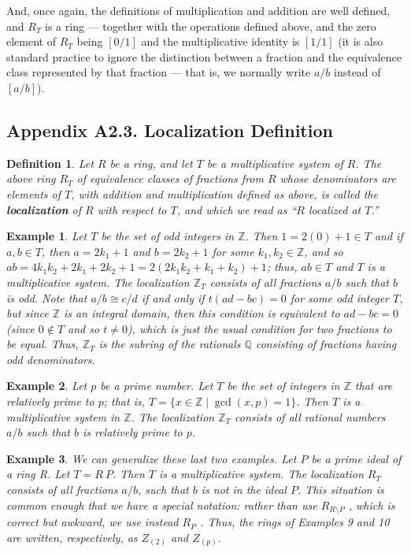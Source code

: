 \documentclass[12pt,reqno]{amsart}
\theoremstyle{plain}
\newtheorem{defi}{Definition}
\newtheorem{ex}{Example}
\newcommand{\zz}{\mathbb Z}
\newcommand{\qq}{\mathbb Q}
\begin{document}
And, once again, the definitions of multiplication and addition are well defined, and $R_T$ is a ring — together with the operations defined above, and the zero element of $R_T$ being $[0/1]$ and the multiplicative identity is $[1/1]$ (it is also standard practice to ignore the distinction between a fraction and the equivalence class represented by that fraction — that is, we normally write $a/b$ instead of $[a/b]$).
 
\subsection{Appendix A2.3. Localization Definition}\begin{defi} Let $R$ be a ring, and let $T$ be a multiplicative system of $R$. The above ring $R_T$ of equivalence classes of fractions from $R$ whose denominators are elements of $T$, with addition and multiplication defined as above, is called the \textbf{localization} of $R$ with respect to $T$, and which we read as ``$R$ localized at $T$.” 
\end{defi} 
\begin{ex} Let $T$ be the set of odd integers in $\zz$. Then $1 = 2(0)+1 \in T$ and if $a, b \in T$, then $a=2k_1 +1 $ and $b=2k_2 + 1$ for some $k_1, k_2 \in \zz$, and so $ab = 4k_1 k_2 +2 k_1 + 2k_2 + 1 = 2(2k_1 k_2 + k_1 + k_2) + 1$; thus, $ab \in T$ and $T$ is a multiplicative system.  The localization $\zz_T$ consists of all fractions $a/b$ such that $b$ is odd. Note that $a/b \cong c/d$ if and only if $t(ad-bc) = 0$ for some odd integer $T$, but since $\zz$ is an integral domain, then this condition is equivalent to $ad-bc = 0$ (since $0 \notin T$ and so $t \neq 0$), which is just the usual condition for two fractions to be equal. Thus, $\zz_T$ is the subring of the rationals $\qq$ consisting of fractions having odd denominators. 
\end{ex} 
\begin{ex} Let $p$ be a prime number. Let $T$ be the set of integers in $\zz$ that are relatively prime to $p$; that is, $T = \{ x \in \zz \mid \gcd (x, p ) = 1\}$. Then $T$ is a multiplicative system in $\zz$. The localization $\zz_T$ consists of all rational numbers $a/b$ such that $b$ is relatively prime to $p$.
\end{ex} 
\begin{ex} 
We can generalize these last two examples. Let $P$ be a prime ideal of a ring R. Let $T = R \ P$. Then $T$ is a multiplicative system. The localization $R_T$ consists of all fractions $a/b$, such that $b$ is not in the ideal $P$. This situation is common enough that we have a special notation: rather than use $R_{ R \setminus P}$ , which is correct but awkward, we use instead $R_P$ . Thus, the rings of Examples 9 and 10 are written, respectively, as $Z_{(2)}$ and $Z_{(p)}$.
\end{ex} 
\end{document}
